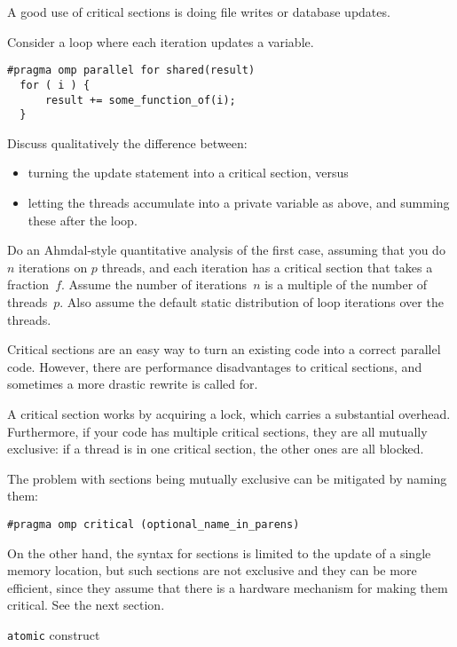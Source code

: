 A good use of critical sections is doing file writes or database updates.

\begin{exercise}
  Consider  a loop where each iteration updates a variable.
\begin{lstlisting}[language=omp]
#pragma omp parallel for shared(result)
  for ( i ) {
      result += some_function_of(i);
  }
\end{lstlisting}
  Discuss qualitatively
  the difference between:
  \begin{itemize}
  \item  turning the update statement into a critical section, versus
  \item letting the threads accumulate into a private variable  as above,
    and summing these after the loop.
  \end{itemize}  
  Do an Ahmdal-style quantitative analysis of the first case, assuming
  that you do $n$ iterations on $p$ threads, and each iteration has a
  critical section that takes a fraction~$f$.  Assume the number of
  iterations~$n$ is a multiple of the number of threads~$p$. Also
  assume the default static distribution of loop iterations over the
  threads.
\end{exercise}

Critical sections are an easy way to turn an existing code into a correct parallel code.
However, there are performance disadvantages to critical sections,
and sometimes a more drastic rewrite
is called for.

A critical section works by acquiring a lock, which carries a substantial overhead.
Furthermore, if your code has multiple critical sections, they are all mutually exclusive:
if a thread is in one critical section, the other ones are all blocked.

The problem with  sections being mutually exclusive can be mitigated by naming them:
\begin{lstlisting}[language=omp]
#pragma omp critical (optional_name_in_parens)
\end{lstlisting}

On the other hand, the syntax for  sections is limited to the update
of a single memory location, but such sections
are not exclusive and they can be more efficient, since they assume that there is a hardware
mechanism for making them critical. See the next section.

 {\texttt{atomic} construct}
\label{sec:atomic}

